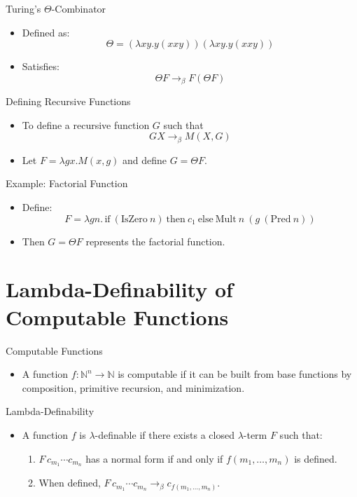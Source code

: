 \documentclass{beamer}
\begin{document}
\begin{frame}{Turing's $\Theta$-Combinator}
  \begin{itemize}
    \item Defined as:
      \[
      \Theta = (\lambda x y. y(x x y)) (\lambda x y. y(x x y))
      \]
    \item Satisfies:
      \[
      \Theta F \rightarrow_\beta F (\Theta F)
      \]
  \end{itemize}
\end{frame}

\begin{frame}{Defining Recursive Functions}
  \begin{itemize}
    \item To define a recursive function \(G\) such that
      \[
      G X \rightarrow_\beta M(X, G)
      \]
    \item Let \(F = \lambda g x. M(x, g)\) and define \(G = \Theta F\).
  \end{itemize}
\end{frame}

\begin{frame}{Example: Factorial Function}
  \begin{itemize}
    \item Define:
      \[
      F = \lambda g n.\, \text{if}\ (\text{IsZero}\ n)\ \text{then}\ c_1\ \text{else}\ \text{Mult}\ n\ (g\ (\text{Pred}\ n))
      \]
    \item Then \(G = \Theta F\) represents the factorial function.
  \end{itemize}
\end{frame}

\section{Lambda-Definability of Computable Functions}
\begin{frame}{Computable Functions}
  \begin{itemize}
    \item A function \(f : \mathbb{N}^n \rightarrow \mathbb{N}\) is computable if it can be built from base functions by composition, primitive recursion, and minimization.
  \end{itemize}
\end{frame}

\begin{frame}{Lambda-Definability}
  \begin{itemize}
    \item A function \(f\) is \(\lambda\)-definable if there exists a closed \(\lambda\)-term \(F\) such that:
      \begin{enumerate}
        \item \(F\,c_{m_1}\cdots c_{m_n}\) has a normal form if and only if \(f(m_1,\dots,m_n)\) is defined.
        \item When defined, \(F\,c_{m_1}\cdots c_{m_n} \rightarrow_\beta c_{f(m_1,\dots,m_n)}\).
      \end{enumerate}
  \end{itemize}
\end{frame}
\end{document}
